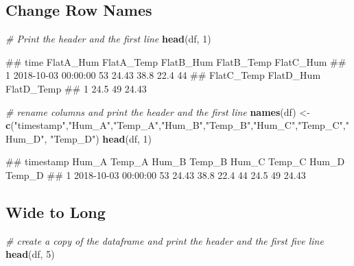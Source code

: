 \documentclass[
]{book}
\newenvironment{Shaded}{\begin{snugshade}}{\end{snugshade}}
\newcommand{\CommentTok}[1]{\textcolor[rgb]{0.56,0.35,0.01}{\textit{#1}}}
\newcommand{\DecValTok}[1]{\textcolor[rgb]{0.00,0.00,0.81}{#1}}
\newcommand{\KeywordTok}[1]{\textcolor[rgb]{0.13,0.29,0.53}{\textbf{#1}}}
\newcommand{\NormalTok}[1]{#1}
\newcommand{\StringTok}[1]{\textcolor[rgb]{0.31,0.60,0.02}{#1}}
\let\oldShaded\Shaded
\let\endoldShaded\endShaded
\renewenvironment{Shaded}{\footnotesize\oldShaded}{\endoldShaded}
\let\oldverbatim\verbatim
\let\endoldverbatim\endverbatim
\renewenvironment{verbatim}{\footnotesize\oldverbatim}{\endoldverbatim}
\begin{document}
\hypertarget{change-row-names}{%
\subsection{Change Row Names}\label{change-row-names}}

\begin{Shaded}
\begin{Highlighting}[]
\CommentTok{# Print the header and the first line}
\KeywordTok{head}\NormalTok{(df, }\DecValTok{1}\NormalTok{)}
\end{Highlighting}
\end{Shaded}

\begin{verbatim}
##                  time FlatA_Hum FlatA_Temp FlatB_Hum FlatB_Temp FlatC_Hum
## 1 2018-10-03 00:00:00        53      24.43      38.8       22.4        44
##   FlatC_Temp FlatD_Hum FlatD_Temp
## 1       24.5        49      24.43
\end{verbatim}

\begin{Shaded}
\begin{Highlighting}[]
\CommentTok{# rename columns and print the header and the first line}
\KeywordTok{names}\NormalTok{(df) <-}\StringTok{ }\KeywordTok{c}\NormalTok{(}\StringTok{"timestamp"}\NormalTok{,}\StringTok{"Hum_A"}\NormalTok{,}\StringTok{"Temp_A"}\NormalTok{,}\StringTok{"Hum_B"}\NormalTok{,}\StringTok{"Temp_B"}\NormalTok{,}\StringTok{"Hum_C"}\NormalTok{,}\StringTok{"Temp_C"}\NormalTok{,}\StringTok{"Hum_D"}\NormalTok{, }\StringTok{"Temp_D"}\NormalTok{)}
\KeywordTok{head}\NormalTok{(df, }\DecValTok{1}\NormalTok{)}
\end{Highlighting}
\end{Shaded}

\begin{verbatim}
##             timestamp Hum_A Temp_A Hum_B Temp_B Hum_C Temp_C Hum_D Temp_D
## 1 2018-10-03 00:00:00    53  24.43  38.8   22.4    44   24.5    49  24.43
\end{verbatim}

\hypertarget{wide-to-long}{%
\subsection{Wide to Long}\label{wide-to-long}}

\begin{Shaded}
\begin{Highlighting}[]
\CommentTok{# create a copy of the dataframe and print the header and the first five line}
\KeywordTok{head}\NormalTok{(df, }\DecValTok{5}\NormalTok{)}
\end{Highlighting}
\end{Shaded}
\end{document}
